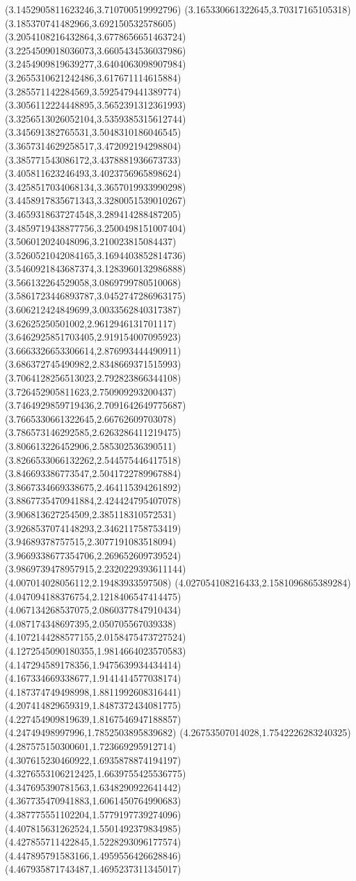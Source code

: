 {(3.1452905811623246,3.710700519992796)
(3.165330661322645,3.70317165105318)
(3.185370741482966,3.692150532578605)
(3.2054108216432864,3.6778656651463724)
(3.2254509018036073,3.6605434536037986)
(3.2454909819639277,3.6404063098907984)
(3.2655310621242486,3.617671114615884)
(3.285571142284569,3.5925479441389774)
(3.3056112224448895,3.5652391312361993)
(3.3256513026052104,3.5359385315612744)
(3.345691382765531,3.5048310186046545)
(3.3657314629258517,3.472092194298804)
(3.385771543086172,3.4378881936673733)
(3.405811623246493,3.4023756965898624)
(3.4258517034068134,3.3657019933990298)
(3.4458917835671343,3.3280051539010267)
(3.4659318637274548,3.289414288487205)
(3.4859719438877756,3.2500498151007404)
(3.506012024048096,3.210023815084437)
(3.5260521042084165,3.1694403852814736)
(3.5460921843687374,3.1283960132986888)
(3.566132264529058,3.0869799780510068)
(3.5861723446893787,3.0452747286963175)
(3.606212424849699,3.0033562840317387)
(3.62625250501002,2.9612946131701117)
(3.6462925851703405,2.919154007095923)
(3.6663326653306614,2.876993444490911)
(3.686372745490982,2.8348669371515993)
(3.7064128256513023,2.792823866344108)
(3.726452905811623,2.750909293200437)
(3.7464929859719436,2.7091642649775687)
(3.7665330661322645,2.66762609703078)
(3.786573146292585,2.6263286411219475)
(3.806613226452906,2.585302536390511)
(3.8266533066132262,2.544575446417518)
(3.846693386773547,2.5041722789967884)
(3.8667334669338675,2.464115394261892)
(3.8867735470941884,2.424424795407078)
(3.906813627254509,2.385118310572531)
(3.9268537074148293,2.346211758753419)
(3.94689378757515,2.3077191083518094)
(3.9669338677354706,2.269652609739524)
(3.9869739478957915,2.2320229393611144)
(4.007014028056112,2.19483933597508)
(4.027054108216433,2.1581096865389284)
(4.047094188376754,2.1218406547414475)
(4.067134268537075,2.0860377847910434)
(4.087174348697395,2.050705567039338)
(4.1072144288577155,2.0158475473727524)
(4.1272545090180355,1.9814664023570583)
(4.147294589178356,1.9475639934434414)
(4.167334669338677,1.9141414577038174)
(4.187374749498998,1.8811992608316441)
(4.207414829659319,1.8487372434081775)
(4.227454909819639,1.8167546947188857)
(4.24749498997996,1.7852503895839682)
(4.26753507014028,1.7542226283240325)
(4.287575150300601,1.723669295912714)
(4.307615230460922,1.6935878874194197)
(4.3276553106212425,1.6639755425536775)
(4.347695390781563,1.6348290922641442)
(4.367735470941883,1.6061450764990683)
(4.387775551102204,1.5779197739274096)
(4.407815631262524,1.5501492379834985)
(4.427855711422845,1.5228293096177574)
(4.447895791583166,1.4959556426628846)
(4.467935871743487,1.4695237311345017)
}
